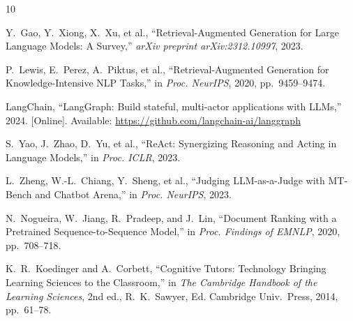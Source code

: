 \documentclass[lettersize,journal]{IEEEtran}
\begin{document}
\begin{thebibliography}{10}


Y.~Gao, Y.~Xiong, X.~Xu, et al., ``Retrieval-Augmented Generation for Large Language Models: A Survey,'' \textit{arXiv preprint arXiv:2312.10997}, 2023.

P.~Lewis, E.~Perez, A.~Piktus, et al., ``Retrieval-Augmented Generation for Knowledge-Intensive NLP Tasks,'' in \textit{Proc. NeurIPS}, 2020, pp.\ 9459--9474.

LangChain, ``LangGraph: Build stateful, multi-actor applications with LLMs,'' 2024. [Online]. Available: \url{https://github.com/langchain-ai/langgraph}

S.~Yao, J.~Zhao, D.~Yu, et al., ``ReAct: Synergizing Reasoning and Acting in Language Models,'' in \textit{Proc. ICLR}, 2023.

L.~Zheng, W.-L.~Chiang, Y.~Sheng, et al., ``Judging LLM-as-a-Judge with MT-Bench and Chatbot Arena,'' in \textit{Proc. NeurIPS}, 2023.

N.~Nogueira, W.~Jiang, R.~Pradeep, and J.~Lin, ``Document Ranking with a Pretrained Sequence-to-Sequence Model,'' in \textit{Proc. Findings of EMNLP}, 2020, pp.\ 708--718.

K.~R.~Koedinger and A.~Corbett, ``Cognitive Tutors: Technology Bringing Learning Sciences to the Classroom,'' in \textit{The Cambridge Handbook of the Learning Sciences}, 2nd ed., R.~K.~Sawyer, Ed. Cambridge Univ.\ Press, 2014, pp.\ 61--78.

\end{thebibliography}

\vfill
\end{document}
